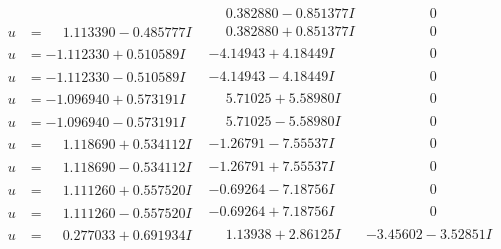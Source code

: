 \documentclass[1p]{elsarticle_modified}
\theoremstyle{definition}
\begin{document}
$$\begin{array}{c|c|c}
 & \phantom{-}0.382880 - 0.851377 I & \phantom{-0.000000 } 0 \\ \hline\begin{aligned}
u &= \phantom{-}1.113390 - 0.485777 I\end{aligned}
 & \phantom{-}0.382880 + 0.851377 I & \phantom{-0.000000 } 0 \\ \hline\begin{aligned}
u &= -1.112330 + 0.510589 I\end{aligned}
 & -4.14943 + 4.18449 I & \phantom{-0.000000 } 0 \\ \hline\begin{aligned}
u &= -1.112330 - 0.510589 I\end{aligned}
 & -4.14943 - 4.18449 I & \phantom{-0.000000 } 0 \\ \hline\begin{aligned}
u &= -1.096940 + 0.573191 I\end{aligned}
 & \phantom{-}5.71025 + 5.58980 I & \phantom{-0.000000 } 0 \\ \hline\begin{aligned}
u &= -1.096940 - 0.573191 I\end{aligned}
 & \phantom{-}5.71025 - 5.58980 I & \phantom{-0.000000 } 0 \\ \hline\begin{aligned}
u &= \phantom{-}1.118690 + 0.534112 I\end{aligned}
 & -1.26791 - 7.55537 I & \phantom{-0.000000 } 0 \\ \hline\begin{aligned}
u &= \phantom{-}1.118690 - 0.534112 I\end{aligned}
 & -1.26791 + 7.55537 I & \phantom{-0.000000 } 0 \\ \hline\begin{aligned}
u &= \phantom{-}1.111260 + 0.557520 I\end{aligned}
 & -0.69264 - 7.18756 I & \phantom{-0.000000 } 0 \\ \hline\begin{aligned}
u &= \phantom{-}1.111260 - 0.557520 I\end{aligned}
 & -0.69264 + 7.18756 I & \phantom{-0.000000 } 0 \\ \hline\begin{aligned}
u &= \phantom{-}0.277033 + 0.691934 I\end{aligned}
 & \phantom{-}1.13938 + 2.86125 I & -3.45602 - 3.52851 I \\ \hline\begin{aligned}

\end{aligned}
\end{array}$$
\end{document}
